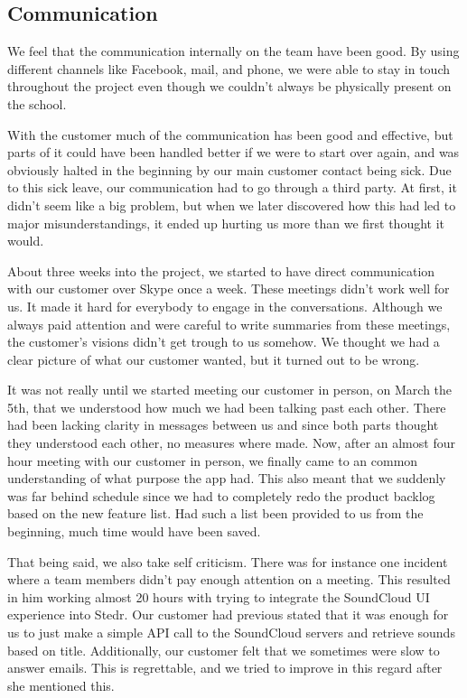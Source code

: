 	\subsection{Communication}

We feel that the communication internally on the team have been good. By using different channels like Facebook, mail, and phone, we were able to stay in touch throughout the project even though we couldn't always be physically present on the school.

With the customer much of the communication has been good and effective, but parts of it could have been handled better if we were to start over again, and was obviously halted in the beginning by our main customer contact being sick. Due to this sick leave, our communication had to go through a third party. At first, it didn't seem like a big problem, but when we later discovered how this had led to major misunderstandings, it ended up hurting us more than we first thought it would.

About three weeks into the project, we started to have direct communication with our customer over Skype once a week. These meetings didn't work well for us. It made it hard for everybody to engage in the conversations. Although we always paid attention and were careful to write summaries from these meetings, the customer's visions didn't get trough to us somehow. We thought we had a clear picture of what our customer wanted, but it turned out to be wrong.

It was not really until we started meeting our customer in person, on March the 5th, that we understood how much we had been talking past each other. There had been lacking clarity in messages between us and since both parts thought they understood each other, no measures where made. Now, after an almost four hour meeting with our customer in person, we finally came to an common understanding of what purpose the app had. This also meant that we suddenly was far behind schedule since we had to completely redo the product backlog based on the new feature list. Had such a list been provided to us from the beginning, much time would have been saved.

That being said, we also take self criticism. There was for instance one incident where a team members didn't pay enough attention on a meeting. This resulted in him working almost 20 hours with trying to integrate the SoundCloud UI experience into Stedr. Our customer had previous stated that it was enough for us to just make a simple API call to the SoundCloud servers and retrieve sounds based on title. Additionally, our customer felt that we sometimes were slow to answer emails. This is regrettable, and we tried to improve in this regard after she mentioned this.

